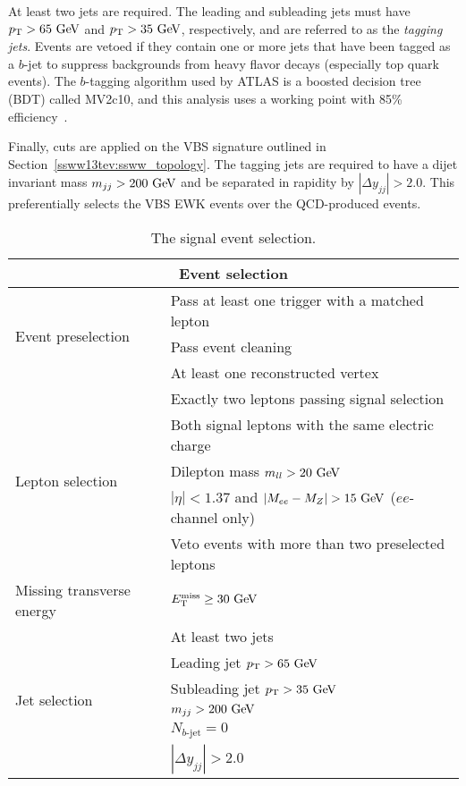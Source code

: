 At least two jets are required.
The leading and subleading jets must have $\pt > 65\gev$ and $\pt > 35\gev$, respectively, and are referred to as the \emph{tagging jets}.
Events are vetoed if they contain one or more jets that have been tagged as a $b$-jet to suppress backgrounds from heavy flavor decays (especially top quark events).
The $b$-tagging algorithm used by ATLAS is a boosted decision tree (BDT) called MV2c10, and this analysis uses a working point with 85\% efficiency~\cite{2018.btag-efficiency-13tev}.

Finally, cuts are applied on the VBS signature outlined in Section~\ref{ssww13tev:ssww_topology}.
The tagging jets are required to have a dijet invariant mass $m_{jj} > 200\gev$ and be separated in rapidity by $|\Delta y_{jj}| > 2.0$.
This preferentially selects the VBS EWK events over the QCD-produced \ssww events.

\begin{table}[htbp]
  \centering
  \begin{tabular}{l | l}
    \multicolumn{2}{c}{Event selection} \\
    \hline\hline
    \multirow{3}{*}{Event preselection} & Pass at least one trigger with a matched lepton \\
                                        & Pass event cleaning \\
                                        & At least one reconstructed vertex\\
    \hline
    \multirow{5}{*}{Lepton selection}   & Exactly two leptons passing signal selection \\
                                        & Both signal leptons with the same electric charge \\
                                        & Dilepton mass $m_{ll} > 20\gev$ \\
                                        & $|\eta| < 1.37$ and $|M_{ee} - M_Z| > 15\gev$ ($ee$-channel only) \\
                                        & Veto events with more than two preselected leptons \\
    \hline
    Missing transverse energy           & $\met \ge 30\gev$\\
    \hline
    \multirow{6}{*}{Jet selection}      & At least two jets \\
                                        & Leading jet $\pt > 65\gev$ \\
                                        & Subleading jet $\pt > 35\gev$\\
                                        & $m_{jj} > 200\gev$ \\
                                        & $N_{b\textrm{-jet}} = 0$ \\ %
                                        & $|\Delta y_{jj}| > 2.0$ \\
    \hline
  \end{tabular}
  \caption{The signal event selection.}
  \label{tab:ssww13tev_event_selection}
\end{table}
